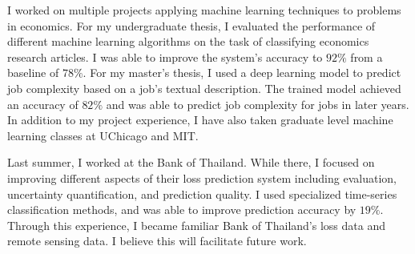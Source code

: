 \documentclass[12pt]{article}
\begin{document}

I worked on multiple projects applying machine learning techniques to problems in economics. For my undergraduate thesis, I evaluated the performance of different machine learning algorithms on the task of classifying economics research articles. I was able to improve the system's accuracy to $92\%$ from a baseline of $78\%$. For my master's thesis, I used a deep learning model to predict job complexity based on a job's textual description. The trained model achieved an accuracy of $82\%$ and was able to predict job complexity for jobs in later years. In addition to my project experience, I have also taken graduate level machine learning classes at UChicago and MIT. 


Last summer, I worked at the Bank of Thailand. While there, I focused on improving different aspects of their loss prediction system including evaluation, uncertainty quantification, and prediction quality. I used specialized time-series classification methods, and was able to improve prediction accuracy by $19\%$. Through this experience, I became familiar Bank of Thailand's loss data and remote sensing data. I believe this will facilitate future work.
\end{document}
